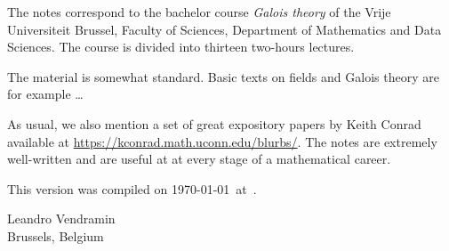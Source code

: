 \preface

The notes correspond to the bachelor 
course \emph{Galois theory} of the 
Vrije Universiteit Brussel, 
Faculty of Sciences, 
Department of Mathematics and Data Sciences. The course
is divided into thirteen two-hours lectures. 

The material is somewhat standard. Basic texts on fields and Galois theory 
are for example \cite{MR1645586}\dots

As usual, we also mention a set of great expository papers by 
Keith Conrad available at 
\url{https://kconrad.math.uconn.edu/blurbs/}. 
The notes are extremely well-written and are useful at  
at every stage of a mathematical career. 
 

This version 
was compiled on \today~at~\currenttime.

\bigskip
\begin{flushright}
Leandro Vendramin\\Brussels, Belgium\par
\end{flushright}
